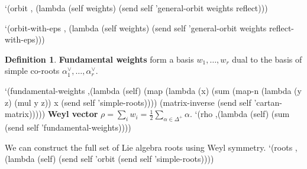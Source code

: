 \documentclass[a4paper,10pt]{article}%
\theoremstyle{definition} \newtheorem{Def}{Definition}
\begin{document}
`(orbit ,
  (lambda (self weights)
    (send self 'general-orbit weights reflect)))

`(orbit-with-eps ,
  (lambda (self weights)
    (send self 'general-orbit weights reflect-with-eps)))
\nwendcode{}\nwdocspar
\begin{Def}
  {\bf Fundamental weights} form a basis $w_1,\dots,w_r$ dual to the basis of simple co-roots $\alpha_1^{\vee},\dots,\alpha_r^{\vee}$.
\end{Def}
\nwenddocs{}\plusendmoddef\nwstartdeflinemarkup{}\nwenddeflinemarkup
`(fundamental-weights
  ,(lambda (self)
     (map (lambda (x)
            (sum (map-n (lambda (y z) (mul y z)) x (send self 'simple-roots))))
          (matrix-inverse (send self 'cartan-matrix)))))
\nwendcode{}\nwdocspar
{\bf Weyl vector} $\rho=\sum_i w_i=\frac{1}{2}\sum_{\alpha\in \Delta^{+}}\alpha$.
\nwenddocs{}\plusendmoddef\nwstartdeflinemarkup{}\nwenddeflinemarkup
`(rho ,(lambda (self)
         (sum (send self 'fundamental-weights))))

\nwendcode{}\nwdocspar
We can construct the full set of Lie algebra roots using Weyl symmetry.
\nwenddocs{}\plusendmoddef\nwstartdeflinemarkup{}\nwenddeflinemarkup
`(roots ,(lambda (self)
           (send self 'orbit (send self 'simple-roots))))
\nwendcode{}\nwdocspar
\end{document}
